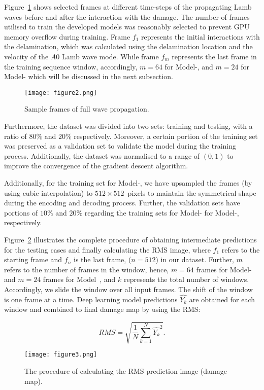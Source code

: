 \begin{sloppypar}
	Figure~\ref{fig:Full_wave} shows selected frames at different time-steps of the propagating Lamb waves before and after the interaction with the damage.
	The number of frames utilised to train the developed models was reasonably selected to prevent GPU memory overflow during training. 
	Frame \(f_{1}\) represents the initial interactions with the delamination, which was calculated using the delamination location and the velocity of the \(A0\) Lamb wave mode.
	While frame \(f_{m}\) represents the last frame in the training sequence window, accordingly, \(m=64\) for Model-, and \(m=24\) for Model- which will be discussed in the next subsection.
	\begin{figure}[!ht]
		\centering
		\texttt{[image: figure2.png]}
		\caption{Sample frames of full wave propagation.}
		\label{fig:Full_wave}
	\end{figure}
	
	Furthermore, the dataset was divided into two sets: training and testing, with a ratio of \(80\%\) and \(20\% \) respectively.
	Moreover, a certain portion of the training set was preserved as a validation set to validate the model during the training process.
	Additionally, the dataset was normalised to a range of \((0, 1)\) to improve the convergence of the gradient descent algorithm.
	
	Additionally, for the training set for Model-, we have upsampled the frames (by using cubic interpolation) to \(512\times512\)~pixels to maintain the symmetrical shape during the encoding and decoding process.
	Further, the validation sets have portions of \(10\%\) and \(20\%\) regarding the training sets for Model- for Model-, respectively.
	
	Figure~\ref{fig:Diagram_exp_predictions} illustrates the complete procedure of obtaining intermediate predictions for the testing cases and finally calculating the RMS image, where \(f_{1}\) refers to the starting frame and \(f_{n}\) is the last frame, (\(n=512\)) in our dataset.
	Further, \(m\) refers to the number of frames in the window, hence, \(m=64\) frames for Model- and \(m=24\) frames for Model~, and \(k\) represents the total number of windows.
	Accordingly, we slide the window over all input frames.
	The shift of the window is one frame at a time.
	Deep learning model predictions \(\hat{Y_k}\) are obtained for each window and combined to final damage map by using the RMS:
	
	\begin{equation}
		RMS = \sqrt{\frac{1}{N}\sum_{k=1}^{N}\hat{Y_k}^2}.	
		\label{RMS}
	\end{equation}
	\begin{figure}[!ht]
		\centering
		\texttt{[image: figure3.png]}
		\caption{The procedure of calculating the RMS prediction image (damage map).}
		\label{fig:Diagram_exp_predictions}
	\end{figure}
\end{sloppypar}
\newpage